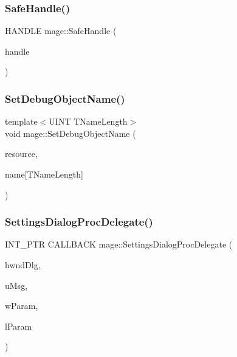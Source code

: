 \subsubsection{\texorpdfstring{Safe\+Handle()}{SafeHandle()}}
{\footnotesize\ttfamily H\+A\+N\+D\+LE mage\+::\+Safe\+Handle (\begin{DoxyParamCaption}\item[{H\+A\+N\+D\+LE}]{handle }\end{DoxyParamCaption})}

\hypertarget{namespacemage_a88833e1a7c6ad614ff6e88cb10eff532}{}\label{namespacemage_a88833e1a7c6ad614ff6e88cb10eff532} 
\subsubsection{\texorpdfstring{Set\+Debug\+Object\+Name()}{SetDebugObjectName()}}
{\footnotesize\ttfamily template$<$U\+I\+NT T\+Name\+Length$>$ \\
void mage\+::\+Set\+Debug\+Object\+Name (\begin{DoxyParamCaption}\item[{\+\_\+\+In\+\_\+ I\+D3\+D11\+Device\+Child $\ast$}]{resource,  }\item[{\+\_\+\+In\+\_\+ const char(\&)}]{name\mbox{[}\+T\+Name\+Length\mbox{]} }\end{DoxyParamCaption})}

\hypertarget{namespacemage_a6b352e8d2bf3eeccf1a5dec3f1cf4130}{}\label{namespacemage_a6b352e8d2bf3eeccf1a5dec3f1cf4130} 
\subsubsection{\texorpdfstring{Settings\+Dialog\+Proc\+Delegate()}{SettingsDialogProcDelegate()}}
{\footnotesize\ttfamily I\+N\+T\+\_\+\+P\+TR C\+A\+L\+L\+B\+A\+CK mage\+::\+Settings\+Dialog\+Proc\+Delegate (\begin{DoxyParamCaption}\item[{H\+W\+ND}]{hwnd\+Dlg,  }\item[{U\+I\+NT}]{u\+Msg,  }\item[{W\+P\+A\+R\+AM}]{w\+Param,  }\item[{L\+P\+A\+R\+AM}]{l\+Param }\end{DoxyParamCaption})}

